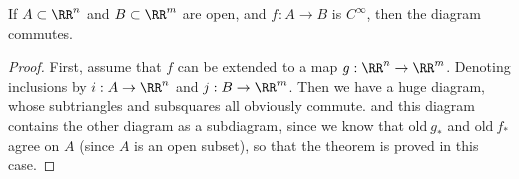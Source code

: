 \begin{lemma}
    If $A \subset \RR^n$ and $B \subset \RR^m$ are open, and $f: A \to B$ is $C^\infty$, then the diagram
    commutes.
\end{lemma}
\begin{proof}
    First, assume that $f$ can be extended to a map $g: \RR^n \to \RR^m$. Denoting inclusions by $i: A \to \RR^n$ and $j : B \to \RR^m$. Then we have a huge diagram, whose subtriangles and subsquares all obviously commute.
    and this diagram contains the other diagram as a subdiagram, since we know that $\text{old}\ g_*$ and $\text{old}\ f_*$ agree on $A$ (since $A$ is an open subset), so that the theorem is proved in this case.


\end{proof}
